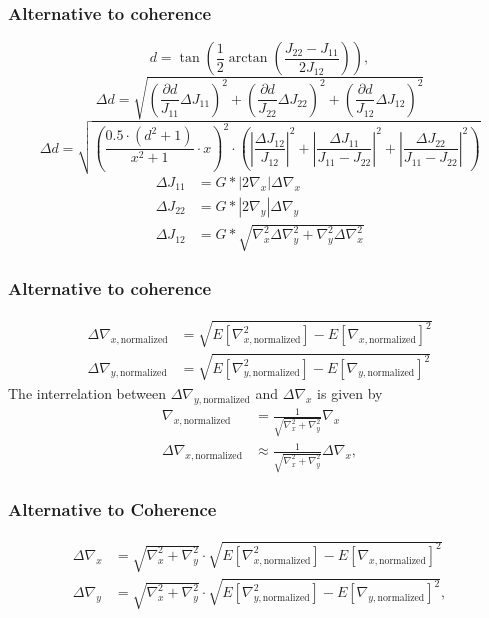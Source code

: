 \documentclass[11pt]{beamer}
\begin{document}
\begin{frame}
\frametitle{Alternative to coherence}
\begin{equation}\label{eq:disparity2}
d = \tan\left(\frac{1}{2} \arctan\left( \frac{J_{22}-J_{11}}{2J_{12}}\right)\right),
\end{equation}
\begin{equation}\label{eq:err_d}
\Delta d = \sqrt{\left(\frac{\partial d}{J_{11}}  \Delta J_{11}\right)^2 + \left(\frac{\partial d}{J_{22}}  \Delta J_{22}\right)^2 + \left(\frac{\partial d}{J_{12}} \Delta J_{12}\right)^2 }
\end{equation}
\begin{equation}\label{eq:deviation_d}
\Delta d =\sqrt{\left(\frac{0.5\cdot(d^2+1)}{x^2+1}\cdot x\right)^2 \cdot \left(\left|\frac{\Delta J_{12}}{J_{12}}\right|^2 + \left|\frac{\Delta J_{11}}{J_{11}-J_{22}}\right|^2 + \left|\frac{\Delta J_{22}}{J_{11}-J_{22}}\right|^2\right)}
\end{equation}
 \begin{align}\label{eq:std_struct}
\Delta J_{11} &= G *|2\nabla_x|\Delta\nabla_x\\
\Delta J_{22} &= G *|2\nabla_y|\Delta\nabla_y\\
\Delta J_{12} &= G *\sqrt{\nabla_x^2\Delta\nabla_y^2 + \nabla_y^2\Delta\nabla_x^2}
\end{align}
\end{frame}

\begin{frame}
\frametitle{Alternative to coherence}
\begin{align}\label{eq:normed_std}
\Delta\nabla_{x, \text{normalized}} &= \sqrt{E[\nabla_{x, \text{normalized}}^2] - E[\nabla_{x, \text{normalized}}]^2}\\
\Delta\nabla_{y, \text{normalized}} &= \sqrt{E[\nabla_{y, \text{normalized}}^2] - E[\nabla_{y, \text{normalized}}]^2}
\end{align}
The interrelation between $\Delta\nabla_{y, \text{normalized}}$ and  $\Delta\nabla_x$ is given by
\begin{align}\label{eq:norm_error}
\nabla_{x, \text{normalized}} &= \frac{1}{\sqrt{\nabla_x^2 + \nabla_y^2}}\nabla_x \\
\Delta \nabla_{x, \text{normalized}} &\approx  \frac{1}{\sqrt{\nabla_x^2 + \nabla_y^2}}\Delta\nabla_x,
\end{align}
\end{frame}

\begin{frame}
\frametitle{Alternative to Coherence}
\begin{align}\label{eq:normed_std_final}
\Delta\nabla_{x} &=  \sqrt{\nabla_x^2 + \nabla_y^2} \cdot \sqrt{E[\nabla_{x, \text{normalized}}^2] - E[\nabla_{x, \text{normalized}}]^2}\\
\Delta\nabla_{y} &= \sqrt{\nabla_x^2 + \nabla_y^2} \cdot \sqrt{E[\nabla_{y, \text{normalized}}^2] - E[\nabla_{y, \text{normalized}}]^2},
\end{align}
\end{frame}
\end{document}
